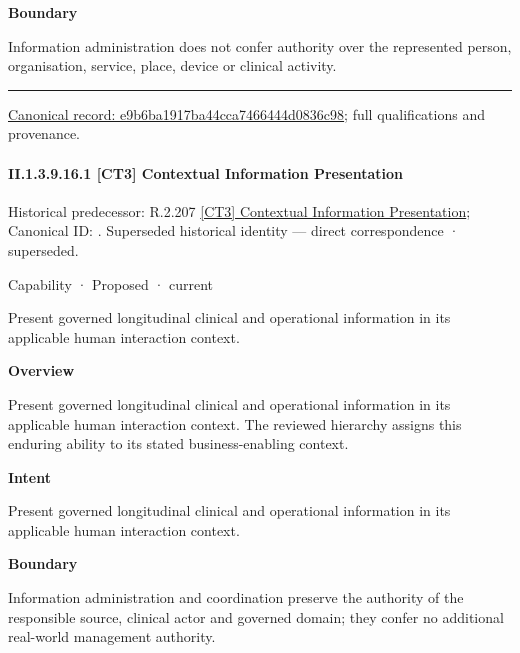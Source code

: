 \textbf{Boundary}



Information administration does not confer authority over the represented person, organisation, service, place, device or clinical activity.



\medskip\hrule\medskip

{\footnotesize \href{../../../../continuum/strategy/capability/e9b6ba1917ba44cca7466444d0836c98.md}{Canonical record: e9b6ba1917ba44cca7466444d0836c98}; full qualifications and provenance.}\par
\paragraph*{II.1.3.9.16.1 [CT3] Contextual Information Presentation}
\label{navigation:II.1.3.9.16.1}

{\small Historical predecessor: R.2.207 \hyperref[element:e349d5f6a8774bbe8d150f9c51af770c]{[CT3] Contextual Information Presentation}; Canonical ID: \texttt{}. Superseded historical identity — direct correspondence · superseded.}\par
\label{element:9f900c53ae56488cad69e53c2205e898}
{\small Capability · Proposed · current}\par

Present governed longitudinal clinical and operational information in its applicable human interaction context.



\textbf{Overview}



Present governed longitudinal clinical and operational information in its applicable human interaction context. The reviewed hierarchy assigns this enduring ability to its stated business-enabling context.



\textbf{Intent}



Present governed longitudinal clinical and operational information in its applicable human interaction context.



\textbf{Boundary}



Information administration and coordination preserve the authority of the responsible source, clinical actor and governed domain; they confer no additional real-world management authority.


